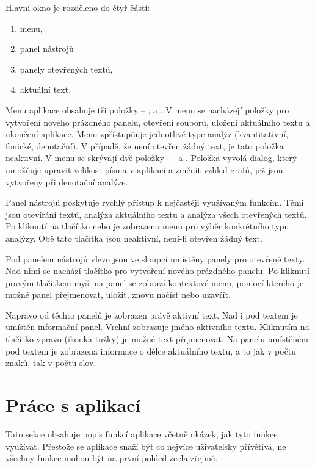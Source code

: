 \documentclass[dp.tex]{subfiles}
\begin{document}
Hlavní okno je rozděleno do čtyř částí:

\begin{enumerate}
	\item menu,
	\item panel nástrojů
	\item panely otevřených textů,
	\item aktuální text.
\end{enumerate}

Menu aplikace obsahuje tři položky -- ,  a . V menu  se nacházejí položky pro vytvoření nového prázdného panelu, otevření souboru, uložení aktuálního textu a ukončení aplikace. Menu  zpřístupňuje jednotlivé type analýz (kvantitativní, fonické, denotační). V případě, že není otevřen žádný text, je tato položka neaktivní. V menu  se skrývají dvě položky ---  a . Položka  vyvolá dialog, který umožňuje upravit velikost písma v aplikaci a změnit vzhled grafů, jež jsou vytvořeny při denotační analýze.

Panel nástrojů poskytuje rychlý přístup k nejčastěji využívaným funkcím. Těmi jsou otevírání textů, analýza aktuálního textu a analýza všech otevřených textů. Po kliknutí na tlačítko  nebo  je zobrazeno menu pro výběr konkrétního typu analýzy. Obě tato tlačítka jsou neaktivní, není-li otevřen žádný text.

Pod panelem nástrojů vlevo jsou ve sloupci umístěny panely pro otevřené texty. Nad nimi se nachází tlačítko pro vytvoření nového prázdného panelu. Po kliknutí pravým tlačítkem myši na panel se zobrazí kontextové menu, pomocí kterého je možné panel přejmenovat, uložit, znovu načíst nebo uzavřít.

Napravo od těchto panelů je zobrazen právě aktivní text. Nad i pod textem je umístěn informační panel. Vrchní zobrazuje jméno aktivního textu. Kliknutím na tlačítko vpravo (ikonka tužky) je možné text přejmenovat. Na panelu umístěném pod textem je zobrazena informace o délce aktuálního textu, a to jak v počtu znaků, tak v počtu slov.

\section{Práce s aplikací}

Tato sekce obsahuje popis funkcí aplikace včetně ukázek, jak tyto funkce využívat. Přestože se aplikace snaží být co nejvíce uživatelsky přívětivá, ne všechny funkce mohou být na první pohled zcela zřejmé.
\end{document}
